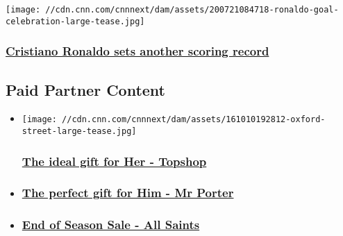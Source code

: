 \href{/2020/07/21/football/cristiano-ronaldo-juventus-lazio-serie-a-spt-intl/index.html}{}

\texttt{[image: //cdn.cnn.com/cnnnext/dam/assets/200721084718-ronaldo-goal-celebration-large-tease.jpg]}

\hypertarget{cristiano-ronaldo-sets-another-scoring-record}{%
\subsubsection{\texorpdfstring{\href{/2020/07/21/football/cristiano-ronaldo-juventus-lazio-serie-a-spt-intl/index.html}{Cristiano
Ronaldo sets another scoring
record}}{Cristiano Ronaldo sets another scoring record}}\label{cristiano-ronaldo-sets-another-scoring-record}}

\hypertarget{paid-partner-content-}{%
\subsection{Paid Partner Content~}\label{paid-partner-content-}}

\begin{itemize}
\item
  \href{http://topshop.com/}{}

  \texttt{[image: //cdn.cnn.com/cnnnext/dam/assets/161010192812-oxford-street-large-tease.jpg]}

  \hypertarget{the-ideal-gift-for-her---topshop}{%
  \subsubsection{\texorpdfstring{\href{http://topshop.com/}{The ideal
  gift for Her -
  Topshop}}{The ideal gift for Her - Topshop}}\label{the-ideal-gift-for-her---topshop}}
\item
  \hypertarget{the-perfect-gift-for-him---mr-porter}{%
  \subsubsection{\texorpdfstring{\href{http://mrporter.com/}{The perfect
  gift for Him - Mr
  Porter}}{The perfect gift for Him - Mr Porter}}\label{the-perfect-gift-for-him---mr-porter}}
\item
  \hypertarget{end-of-season-sale---all-saints}{%
  \subsubsection{\texorpdfstring{\href{http://us.allsaints.com/}{End of
  Season Sale - All
  Saints}}{End of Season Sale - All Saints}}\label{end-of-season-sale---all-saints}}
\end{itemize}

